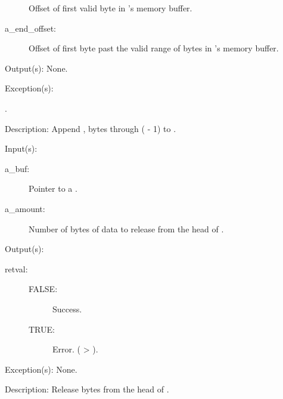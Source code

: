 \begin{capi}
\begin{capilist}
\begin{description}
			Offset of first valid byte in 's memory
			buffer.
		\item[a\_end\_offset: ]
			Offset of first byte past the valid range of bytes in
			's memory buffer.
		\end{description}
	\item[Output(s): ] None.
	\item[Exception(s): ]
		\begin{description}\item[]
		\item[.]
		\end{description}
	\item[Description: ]
		Append , bytes  through
		( - 1) to .
	\end{capilist}
\label{buf_head_data_release}
	\begin{capilist}
	\item[Input(s): ]
		\begin{description}\item[]
		\item[a\_buf: ]
			Pointer to a .
		\item[a\_amount: ]
			Number of bytes of data to release from the head of
			.
		\end{description}
	\item[Output(s): ]
		\begin{description}\item[]
		\item[retval: ]
			\begin{description}\item[]
			\item[FALSE: ]
				 Success.
			\item[TRUE: ]
				 Error.  ( >
				).
			\end{description}
		\end{description}
	\item[Exception(s): ] None.
	\item[Description: ]
		Release  bytes from the head of .
	\end{capilist}
\label{buf_tail_data_release}

\end{capi}
